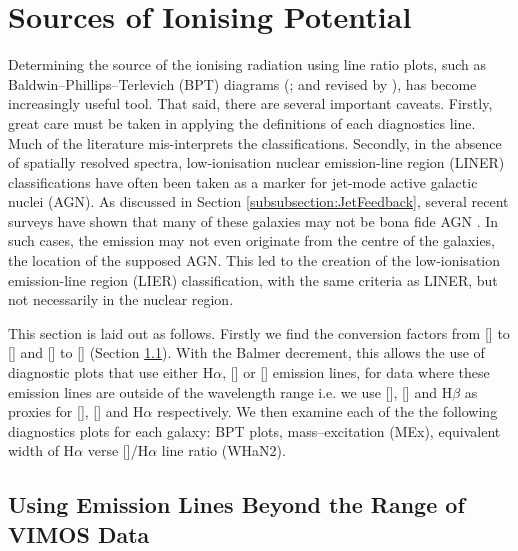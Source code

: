 \section{Sources of Ionising Potential}
	\label{sec:Diagnostics}
	Determining the source of the ionising radiation using line ratio plots, such as Baldwin--Phillips--Terlevich (BPT) diagrams (\citealt{Baldwin1981}; and revised by \citealt{Kewley2001, Kauffmann2003a}), has become increasingly useful tool. That said, there are several important caveats. Firstly, great care must be taken in applying the definitions of each diagnostics line. Much of the literature mis-interprets the classifications. Secondly, in the absence of spatially resolved spectra, low-ionisation nuclear emission-line region (LINER) classifications have often been taken as a marker for jet-mode active galactic nuclei (AGN). As discussed in Section \ref{subsubsection:JetFeedback}, several recent surveys have shown that many of these galaxies may not be bona fide AGN \citep[e.g.][]{Sarzi2005, Sarzi2010, Singh2013, Belfiore2016a}. In such cases, the emission may not even originate from the centre of the galaxies, the location of the supposed AGN. This led to the creation of the low-ionisation emission-line region (LIER) classification, with the same criteria as LINER, but not necessarily in the nuclear region.

	This section is laid out as follows. Firstly we find the conversion factors from [] to [] and [] to [] (Section \ref{subsec:Ndec}). With the Balmer decrement, this allows the use of diagnostic plots that use either H$\alpha$, [] or [] emission lines, for data where these emission lines are outside of the wavelength range i.e. we use [], [] and H$\beta$ as proxies for [], [] and H$\alpha$ respectively. We then examine each of the the following diagnostics plots for each galaxy: BPT plots, mass--excitation (MEx), equivalent width of H$\alpha$ verse []/H$\alpha$ line ratio (WHaN2).%



	\subsection{Using Emission Lines Beyond the Range of VIMOS Data}
		\label{subsec:Ndec}

